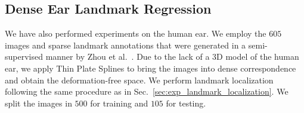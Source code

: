 




\subsection{Dense Ear Landmark Regression}
\label{sec:exp_ear}

We have also performed experiments on the human ear. We employ the $605$ images and sparse landmark annotations that were generated in a semi-supervised manner by Zhou et al.~\cite{Zhou_2016_CVPR}. Due to the lack of a 3D model of the human ear, we apply Thin Plate Splines to bring the images into dense correspondence and obtain the deformation-free space. We perform landmark localization following the same procedure as in Sec.~\ref{sec:exp_landmark_localization}.
We split the images in $500$ for training and $105$ for testing.  


